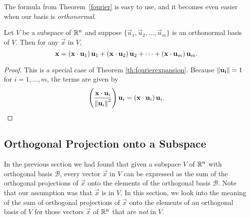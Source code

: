 \documentclass{ximera}
\begin{document}
The formula from Theorem~\ref{fourier} is easy to use, and it becomes even easier when our basis is \emph{orthonormal}.

\begin{corollary}
Let $V$ be a subspace of $\mathbb{R}^n$ and suppose $\{ \vec{u}_1, \vec{u}_2, \ldots, \vec{u}_m \}$
is an orthonormal basis of $V$.
Then for any $\vec{x}$ in $V$,
\[ \mathbf{x} =
\left(\mathbf{x}\cdot \mathbf{u}_1\right) \mathbf{u}_1 +
\left(\mathbf{x}\cdot \mathbf{u}_2\right) \mathbf{u}_2 +
\cdots +
\left(\mathbf{x}\cdot \mathbf{u}_m\right)  \mathbf{u}_m.
\]
\end{corollary}
\begin{proof}
This is a special case of Theorem \ref{th:fourierexpansion}.  Because $\left\lVert\mathbf{u_i}\right\rVert = 1$ for $i=1,\ldots,m$, %
the terms are given by 
$$\left(\frac{\mathbf{x}\cdot \mathbf{u}_i}{\left\lVert\mathbf{u}_i\right\rVert^2}\right)\mathbf{u}_i=\left(\mathbf{x}\cdot \mathbf{u}_i\right) \mathbf{u}_i.$$

\end{proof}

\subsection*{Orthogonal Projection onto a Subspace}
In the previous section we had found that given a subspace $V$ of $\mathbb{R}^n$ with orthogonal basis $\mathcal{B}$, every vector $\vec{x}$ in $V$ can be expressed as the sum of the orthogonal projections of $\vec{x}$ onto the elements of the orthogonal basis $\mathcal{B}$.  Note that our assumption was that $\vec{x}$ is in $V$.  In this section, we look into the meaning of the sum of orthogonal projections of $\vec{x}$ onto the elements of an orthogonal basis of $V$ for those vectors $\vec{x}$ of $\mathbb{R}^n$ that are \emph{not} in $V$.
\end{document}
